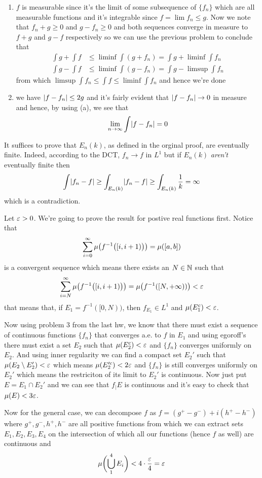\documentclass{article}
\begin{document}
\begin{homeworkProblem}
    \begin{enumerate}[label=\alph*.]
        \item $f$ is measurable since it's the limit of some subsequence of $\{f_n\}$ which are all measurable functions and it's integrable since $f=\lim f_n\leq g$. Now we note that $f_n+g\geq 0$ and $g-f_n\geq 0$ and both sequences converge in measure to $f+g$ and $g-f$ respectively so we can use the previous problem to conclude that
        \begin{align*}
            \int g + \int f &\leq \liminf \int (g+f_n) = \int g + \liminf \int f_n \\
            \int g - \int f &\leq \liminf \int (g-f_n) = \int g - \limsup \int f_n
        \end{align*}
        from which $\limsup \int f_n\leq \int f\leq \liminf \int f_n$ and hence we're done
        \item we have $\abs{f-f_n}\leq 2g$ and it's fairly evident that $\abs{f-f_n}\to 0$ in measure and hence, by using (a), we see that
        \[
            \lim_{n\to\i}\int\abs{f-f_n}=0
        \]
    \end{enumerate}
\end{homeworkProblem}
\begin{homeworkProblem}[40]
    It suffices to prove that $E_n(k)$, as defined in the orginal proof, are eventually finite. Indeed, according to the DCT, $f_n\to f$ in $L^1$ but if $E_n(k)$ \emph{aren't} eventually finite then 
    \[\int \abs{f_n-f}\geq \int_{E_n(k)}\abs{f_n-f}\geq \int_{E_n(k)}\frac{1}{k} = \i\]
    which is a contradiction. 
\end{homeworkProblem}
\begin{homeworkProblem}[44]
    Let $\varepsilon>0$. We're going to prove the result for postive real functions first. Notice that
    \[\sum_{i=0}^\infty\mu\big(f^{-1}\big([i, i+1)\big)\big)=\mu([a, b])\]
    is a convergent sequence which means there exists an $N\in\mathbb{N}$ such that
    \[\sum_{i=N}^\infty\mu\big(f^{-1}\big([i, i+1)\big)\big)=\mu\big(f^{-1}([N, +\infty))\big)<\varepsilon\]
    that means that, if $E_1=f^{-1}([0, N))$, then $f_{E_1}\in L^1$ and $\mu(E_1^c)<\varepsilon$.

    Now using problem 3 from the last hw, we know that there must exist a sequence of continuous functions $\{f_n\}$ that converges a.e. to $f$ in $E_1$ and using egoroff's there must exist a set $E_2$ such that $\mu(E_2^c)<\varepsilon$ and $\{f_n\}$ converges uniformly on $E_2$. And using inner regularity we can find a compact set $E_2'$ such that $\mu(E_2\setminus E_2')<\varepsilon$ which means $\mu(E_2'^c)<2\varepsilon$ and $\{f_n\}$ is still converges uniformly on $E_2'$ which means the restriciton of its limit to $E_2'$ is continuous. Now just put $E=E_1\cap E_2'$ and we can see that $f_|E$ is continuous and it's easy to check that $\mu(E)<3\varepsilon$.

    Now for the general case, we can decompose $f$ as $f=(g^+-g^-)+i(h^+-h^-)$ where $g^+,g^-,h^+,h^-$ are all positive functions from which we can extract sets $E_1, E_2, E_3, E_4$ on the intersection of which all our functions (hence $f$ as well) are continuous and
    \[\mu\biggl(\bigcup_1^4 E_i\biggr)<4\cdot \frac{\varepsilon}{4}=\varepsilon\]
\end{homeworkProblem}
\end{document}
